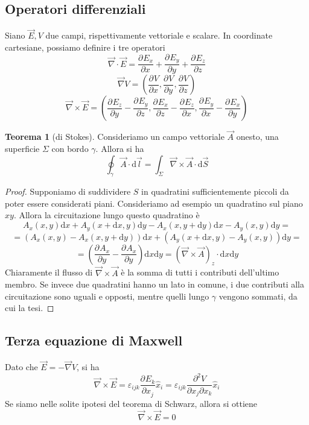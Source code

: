 \documentclass[a4paper,11pt]{book}
\let\oldnabla\nabla
\renewcommand{\nabla}{\vec{\oldnabla}}
\newcommand{\der}[3][]{\frac{\partial ^{#1}#2}{\partial #3^{#1}}}
\newcommand{\dif}{\mathrm{d}}
\let\oldepsilon\epsilon
\let\oldvarepsilon\varepsilon
\renewcommand{\epsilon}{\oldvarepsilon}
\renewcommand{\varepsilon}{\oldepsilon}
\theoremstyle{definition}
\theoremstyle{theorem}
\newtheorem{teorema}{Teorema}[section]
\begin{document}
	\subsection{Operatori differenziali}
	Siano $\vec{E},V$ due campi, rispettivamente vettoriale e scalare. In coordinate cartesiane, possiamo definire i tre operatori
	\[\nabla\cdot\vec{E}=\der{E_x}{x}+\der{E_y}{y}+\der{E_z}{z}\]
	\[\nabla V=\left(\der{V}{x},\der{V}{y},\der{V}{z}\right)\]
	\[\nabla\times\vec{E}=\left(\der{E_z}{y}-\der{E_y}{z},\der{E_x}{z}-\der{E_z}{x},\der{E_y}{x}-\der{E_x}{y}\right)\]
	\begin{teorema}[di Stokes]
		Consideriamo un campo vettoriale $\vec{A}$ onesto, una superficie $\Sigma$ con bordo $\gamma$. Allora si ha
		\[\oint_{\gamma}\vec{A}\cdot\dif\vec{l}=\int_{\Sigma}\nabla\times\vec{A}\cdot\dif\vec{S}\]
	\end{teorema}
	\begin{proof}
		Supponiamo di suddividere $S$ in quadratini sufficientemente piccoli da poter essere considerati piani. Consideriamo ad esempio un quadratino sul piano $xy$. Allora la circuitazione lungo questo quadratino è
		\[A_x(x,y)\dif x+A_y(x+\dif x,y)\dif y-A_x(x,y+\dif y)\dif x-A_y(x,y)\dif y=\]\[=\left(A_x(x,y)-A_x(x,y+\dif y)\right)\dif x+\left(A_y(x+\dif x,y)-A_y(x,y)\right)\dif y=\]\[=\left(\der{A_x}{y}-\der{A_x}{y}\right)\dif x\dif y=\left(\nabla\times\vec{A}\right)_z\cdot\dif x\dif y\]
		Chiaramente il flusso di $\nabla\times\vec{A}$ è la somma di tutti i contributi dell'ultimo membro. Se invece due quadratini hanno un lato in comune, i due contributi alla circuitazione sono uguali e opposti, mentre quelli lungo $\gamma$ vengono sommati, da cui la tesi.
	\end{proof}
	\subsection{Terza equazione di Maxwell}
	Dato che $\vec{E}=-\nabla V$, si ha
	\[\nabla\times\vec{E}=\epsilon_{ijk}\der{E_k}{x_j}\hat{x}_i=\epsilon_{ijk}\frac{\partial^2V}{\partial x_j\partial x_k}\hat{x}_i\]
	Se siamo nelle solite ipotesi del teorema di Schwarz, allora si ottiene
	\[\nabla\times\vec{E}=0\]
\end{document}
